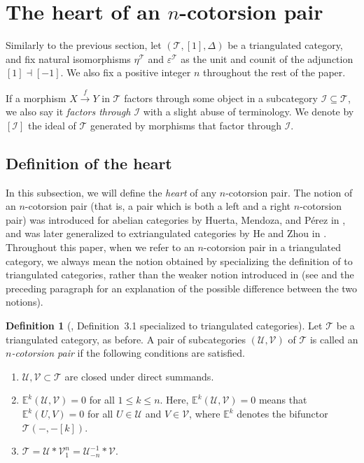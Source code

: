 \documentclass[a4paper,reqno,10pt]{amsart}
\theoremstyle{definition}
\newtheorem{definition}[definition]{Definition}
\theoremstyle{definition}
\theoremstyle{definition}
\theoremstyle{definition}
\theoremstyle{plain}
\newcommand{\xto}{\xrightarrow}
\newcommand{\sse}{\subseteq}
\newcommand{\BE}{\mathbb{E}}
\newcommand{\CI}{\mathcal{I}}
\newcommand{\CT}{\mathcal{T}}
\newcommand{\CU}{\mathcal{U}}
\newcommand{\CV}{\mathcal{V}}
\begin{document}
\normalcolor
\section{The heart of an \texorpdfstring{$n$}{n}-cotorsion pair}\label{section:heart}
Similarly to the previous section, let $(\CT,[1],\Delta)$ be a triangulated category, and fix natural isomorphisms $\eta^{\CT}$ and $\varepsilon^{\CT}$ as the unit and counit of the adjunction $[1]\dashv[-1]$. We also fix a positive integer $n$ throughout the rest of the paper.

If a morphism $X\xto{f}Y$ in $\CT$ factors through some object in a subcategory $\CI\sse\CT$, we also say it \emph{factors through $\CI$} with a slight abuse of terminology. 
We denote by $[\CI]$ the ideal of $\CT$ generated by morphisms that factor through $\CI$. 
\normalcolor

\subsection{Definition of the heart}
\label{subsection:heart}
In this subsection, we will define the \emph{heart} of any $n$-cotorsion pair. 
The notion of an $n$-cotorsion pair (that is, a pair which is both a left and a right $n$-cotorsion pair) was introduced for abelian categories by Huerta, Mendoza, and P\'erez in \cite{HMP21}, and was later generalized to extriangulated categories by He and Zhou in \cite{HZ22}.
Throughout this paper, when we refer to an $n$-cotorsion pair in a triangulated category, we always mean the notion obtained by specializing the definition of \cite{HZ22} to triangulated categories, rather than the weaker notion introduced in \cite{CZ25} (see \cite[Example~3.5]{CZ25} and the preceding paragraph for an explanation of the possible difference between the two notions).

\begin{definition}[\cite{HZ22}, Definition~3.1 specialized to triangulated categories]
Let $\CT$ be a triangulated category, as before.
A pair of subcategories $(\CU,\CV)$ of $\CT$ is called an \emph{$n$-cotorsion pair} if the following conditions are satisfied.
\begin{enumerate}
\item $\CU,\CV\subset\CT$ are closed under direct summands.
\item $\BE^k(\CU,\CV)=0$ for all $1\le k\le n$. Here, $\BE^k(\CU,\CV)=0$ means that $\BE^k(U,V)=0$ for all $U\in\CU$ and $V\in\CV$, where $\BE^k$ denotes the bifunctor $\CT(-,-[k])$.
\item $\CT=\CU\ast\CV_1^n=\CU_{-n}^{-1}\ast\CV$.
\end{enumerate}
\end{definition}
\end{document}
